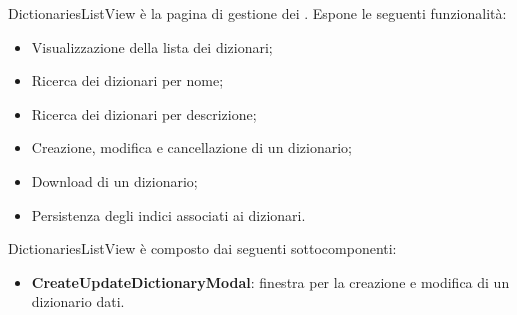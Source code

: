 \par DictionariesListView è la pagina di gestione  dei . Espone le seguenti funzionalità:
\begin{itemize}
  \item Visualizzazione della lista dei dizionari;
  \item Ricerca dei dizionari per nome;
  \item Ricerca dei dizionari per descrizione;
  \item Creazione, modifica e cancellazione di un dizionario;
  \item Download di un dizionario;
  \item Persistenza degli indici associati ai dizionari.
\end{itemize}

\par DictionariesListView è composto dai seguenti sottocomponenti:
\begin{itemize}
  \item \textbf{CreateUpdateDictionaryModal}: finestra per la creazione e modifica di un dizionario dati.
\end{itemize}

